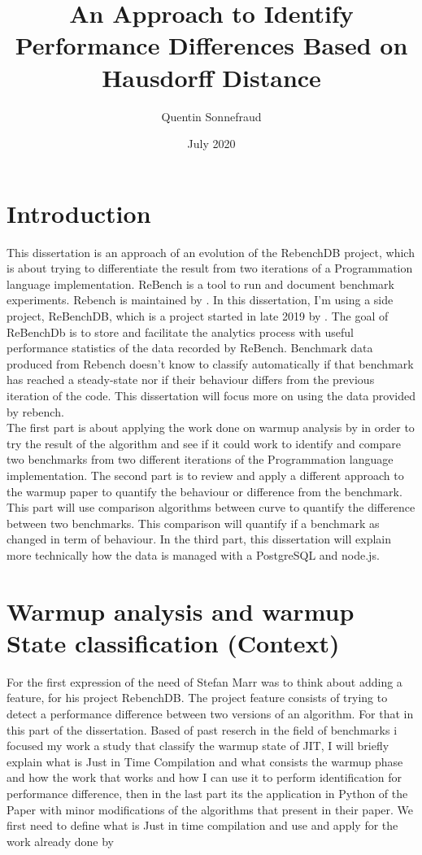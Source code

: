 \documentclass{article}
\title{An Approach to Identify Performance Differences Based on Hausdorff Distance}
\author{Quentin Sonnefraud}
\date{July 2020}
\begin{document}
\maketitle

\tableofcontents

\section{Introduction}

This dissertation is an approach of an evolution of the RebenchDB project, which is about trying to differentiate the result from two iterations of a Programmation language implementation. 
ReBench is a tool to run and document benchmark experiments. Rebench is maintained by \citep{ReBench:2018}. In this dissertation, I'm using a side project, ReBenchDB, which is a project started in late 2019 by \citep{ReBench:2018}. The goal of ReBenchDb is to store and facilitate the analytics process with useful performance statistics of the data recorded by ReBench. Benchmark data produced from Rebench doesn't know to classify automatically if that benchmark has reached a steady-state nor if their behaviour differs from the previous iteration of the code. This dissertation will focus more on using the data provided by rebench. \\ 
The first part is about applying the work done on warmup analysis by \citep{barrett2017virtual} in order to try the result of the algorithm and see if it could work to identify and compare two benchmarks from two different iterations of the Programmation language implementation.
The second part is to review and apply a different approach to the warmup paper to quantify the behaviour or difference from the benchmark. This part will use comparison algorithms between curve to quantify the difference between two benchmarks. This comparison will quantify if a benchmark as changed in term of behaviour. In the third part, this dissertation will explain more technically how the data is managed with a PostgreSQL and node.js.\\


\section{Warmup analysis and warmup State classification (Context)}

For the first expression of the need of Stefan Marr was to think about adding a feature, for his project RebenchDB. The project feature consists of trying to detect a performance difference between two versions of an algorithm. For that in this part of the dissertation. Based of past reserch in the field of benchmarks i focused my work a study that classify the warmup state of JIT, I will briefly explain what is Just in Time Compilation and what consists the warmup phase and how the work that \citep{barrett2017virtual} works and how I can use it to perform identification for performance difference, then in the last part its the application in Python of the Paper with minor modifications of the algorithms that \citep{barrett2017virtual} present in their paper. We first need to define what is Just in time compilation and use and apply for the work already done by \citep{barrett2017virtual}
\end{document}

